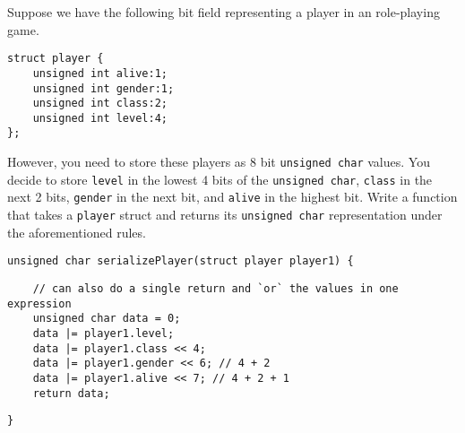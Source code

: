 Suppose we have the following bit field representing a player in an role-playing game.

\begin{verbatim}
struct player {
    unsigned int alive:1;
    unsigned int gender:1;
    unsigned int class:2;
    unsigned int level:4;
};
\end{verbatim}

However, you need to store these players as 8 bit \texttt{unsigned char} values.
You decide to store \texttt{level} in the lowest 4 bits of the \texttt{unsigned char},
\texttt{class} in the next 2 bits,
\texttt{gender} in the next bit,
and \texttt{alive} in the highest bit.
Write a function that takes a \texttt{player} struct and
returns its \texttt{unsigned char} representation under the aforementioned rules.

\begin{verbatim}
unsigned char serializePlayer(struct player player1) {
\end{verbatim}
\begin{answer}
\begin{verbatim}
    // can also do a single return and `or` the values in one expression
    unsigned char data = 0;
    data |= player1.level;
    data |= player1.class << 4;
    data |= player1.gender << 6; // 4 + 2
    data |= player1.alive << 7; // 4 + 2 + 1
    return data;
\end{verbatim}
\end{answer}
\begin{verbatim}
}
\end{verbatim}
